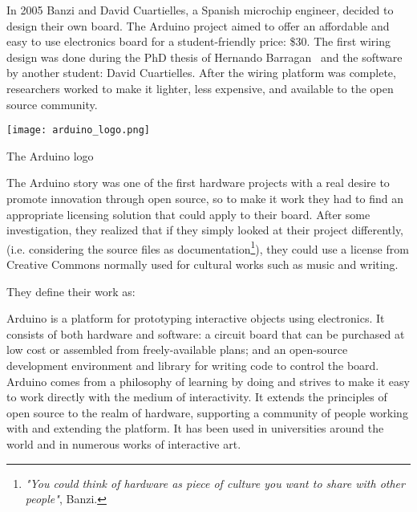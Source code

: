 \begin{row}{4}{2}
    \begin{cell}{3}
      In 2005 Banzi and David Cuartielles, a Spanish microchip engineer, decided to design their own board. The Arduino project aimed to offer an affordable and easy to use electronics board for a student-friendly price: \$30. The first wiring design was done during the PhD thesis of Hernando Barragan~\parencite{barragan2004wiring} and the software by another student: David Cuartielles.
      After the wiring platform was complete, researchers worked to make it lighter, less expensive, and available to the open source community.
    \end{cell}
    \begin{cell}{1}
        \begin{NFfigure}
            \centering
                \texttt{[image: arduino\_logo.png]}
            \caption{The Arduino logo}
            \label{fig:arduino_logo}
        \end{NFfigure}
    \end{cell}
\end{row}

The Arduino story was one of the first hardware projects with a real desire to promote innovation through open source, so to make it work they had to find an appropriate licensing solution that could apply to their board. After some investigation, they realized that if they simply looked at their project differently, (i.e. considering the source files as documentation\footnote{\emph{"You could think of hardware as piece of culture you want to share with other people"}, Banzi. }), they could use a license from Creative Commons normally used for cultural works such as music and writing.

They define their work as:

\begin{formal}
  Arduino is a platform for prototyping interactive objects using electronics. It consists of both hardware and software: a circuit board that can be purchased at low cost or assembled from freely-available plans; and an open-source development environment and library for writing code to control the board. Arduino comes from a philosophy of learning by doing and strives to make it easy to work directly with the medium of interactivity. It extends the principles of open source to the realm of hardware, supporting a community of people working with and extending the platform. It has been used in universities around the world and in numerous works of interactive art.

\end{formal}


